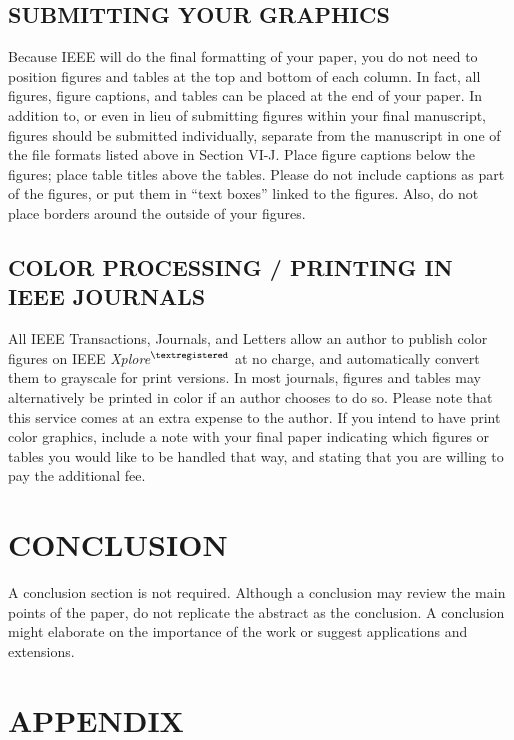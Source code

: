 \documentclass{IEEEojcsys}
\begin{document}

\subsection{SUBMITTING YOUR GRAPHICS}

Because IEEE will do the final formatting of your paper, you do not need to position figures and tables at the top and bottom of each column. In fact, all figures, figure captions, and tables can be placed at the end of your paper. In addition to, or even in lieu of submitting figures within your final manuscript, figures should be submitted individually, separate from the manuscript in one of the file formats listed above in Section VI-J. Place figure captions below the figures; place table titles above the tables. Please do not include captions as part of the figures, or put them in ``text boxes'' linked to the figures. Also, do not place borders around the outside of your figures.


\subsection{COLOR PROCESSING / PRINTING IN IEEE JOURNALS}

All IEEE Transactions, Journals, and Letters allow an author to publish color figures on IEEE {\it Xplore}$^{\scriptsize\textregistered}$ at no charge, and automatically convert them to grayscale for print versions. In most journals, figures and tables may alternatively be printed in color if an author chooses to do so. Please note that this service comes at an extra expense to the author. If you intend to have print color graphics, include a note with your final paper indicating which figures or tables you would like to be handled that way, and stating that you are willing to pay the additional fee.

\section{CONCLUSION}

A conclusion section is not required. Although a conclusion may review the main points of the paper, do not replicate the abstract as the conclusion. A conclusion might elaborate on the importance of the work or suggest applications and extensions.

\section*{APPENDIX}
\end{document}

